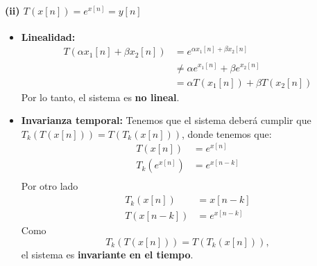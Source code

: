 \documentclass[
  11pt,
  letterpaper,
   addpoints,
   answers
  ]{exam}
\begin{document}
\begin{questions}
\begin{solution}
  \paragraph{(ii) $T(x[n]) = e^{x[n]} = y[n]$}
\begin{itemize}
  \item \textbf{Linealidad:}
  \begin{align}
  T(\alpha x_1[n] + \beta x_2[n]) &= e^{\alpha x_1[n] + \beta x_2[n]} \\
  &\neq \alpha e^{x_1[n]} + \beta e^{x_2[n]} \\
  &= \alpha T(x_1[n]) + \beta T(x_2[n])
  \end{align}
  Por lo tanto, el sistema es \textbf{no lineal}.
  \item \textbf{Invarianza temporal:}
  Tenemos que el sistema deberá cumplir que $T_{k}(T(x[n])) = T(T_{k}(x[n]))$, donde tenemos que:
  \begin{align}
  T(x[n]) &= e^{x[n]} \\
  T_k(e^{x[n]}) &= e^{x[n-k]} \\
  \end{align}
  Por otro lado
  \begin{align}
  T_k(x[n]) &= x[n-k]\\
  T(x[n-k]) &= e^{x[n-k]}
  \end{align}
  Como
  \begin{equation}
  T_k(T(x[n])) = T(T_k(x[n])),
  \end{equation}
  el sistema es \textbf{invariante en el tiempo}.
\end{itemize}


\end{solution}
\end{questions}
\end{document}
